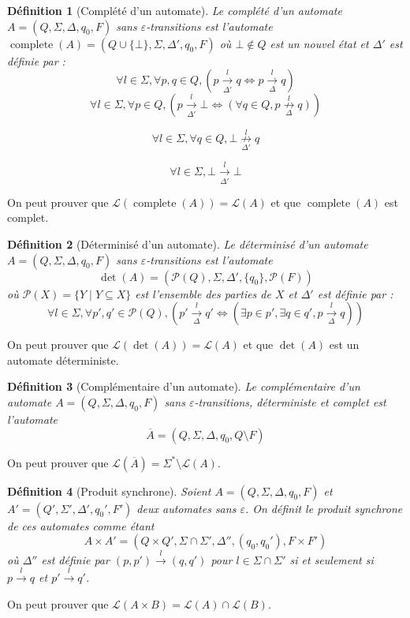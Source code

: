 \documentclass[10pt,a4paper]{article}
\newtheorem{mydef}{D\'efinition}
\begin{document}
\begin{mydef}[Compl\'et\'e d'un automate]
Le compl\'et\'e d'un automate $A = (Q, \Sigma, \Delta, q_0, F)$ sans $\varepsilon$-transitions est l'automate $\operatorname{complete}(A) = (Q\cup\{\bot\}, \Sigma, \Delta', q_0, F)$ o\`u $\bot\not\in Q$ est un nouvel \'etat et $\Delta'$ est d\'efinie par :
$$\forall l \in \Sigma,\forall p,q \in Q, \left(p\underset{\Delta'}{\overset{l}{{\to}}}q \iff p\underset{\Delta}{\overset{l}{{\to}}}q\right)$$
$$\forall l \in \Sigma, \forall p \in Q, \left(p\underset{\Delta'}{\overset{l}{{\to}}}\bot \iff \left(\forall q \in Q, p\underset{\Delta}{\overset{l}{{\not\to}}}q\right)\right)$$

$$\forall l \in \Sigma, \forall q \in Q,\bot\underset{\Delta'}{\overset{l}{{\not\to}}}q$$

$$\forall l \in \Sigma, \bot\underset{\Delta'}{\overset{l}{{\to}}}\bot$$
\end{mydef}

On peut prouver que $\mathcal L(\operatorname{complete}(A)) = \mathcal L(A)$ et que $\operatorname{complete}(A)$ est complet.

\begin{mydef}[D\'eterminis\'e d'un automate]
Le d\'eterminis\'e d'un automate $A = (Q, \Sigma, \Delta, q_0, F)$ sans $\varepsilon$-transitions est l'automate $$\det(A) = (\mathcal P(Q), \Sigma, \Delta', \{q_0\}, \mathcal P(F))$$ o\`u $\mathcal P(X)=\{Y\mid Y \subseteq X\}$ est l'ensemble des parties de $X$ et $\Delta'$ est d\'efinie par :
$$\forall l \in \Sigma,\forall p',q' \in \mathcal P(Q), \left(p'\underset{\Delta}{\overset{l}{{\to}}}q' \iff \left( \exists p \in p', \exists q \in q', p\underset{\Delta}{\overset{l}{{\to}}}q\right)\right)$$
\end{mydef}

On peut prouver que $\mathcal L(\det(A))=\mathcal L(A)$ et que $\det(A)$ est un automate d\'eterministe.

\begin{mydef}[Compl\'ementaire d'un automate]
Le compl\'ementaire d'un automate $A = (Q, \Sigma, \Delta, q_0, F)$ sans $\varepsilon$-transitions, d\'eterministe et complet est l'automate $$\overline{A} = (Q, \Sigma, \Delta, q_0, Q\setminus F)$$
\end{mydef}

On peut prouver que $\mathcal L\left(\overline{A}\right) = \Sigma^* \setminus \mathcal L(A)$.

\begin{mydef}[Produit synchrone]
Soient $A = (Q, \Sigma, \Delta, q_0, F)$ et $A' = (Q', \Sigma', \Delta', q_0', F')$ deux automates sans $\varepsilon$. On définit le produit synchrone de ces automates comme \'etant $$A\times A' = (Q \times Q', \Sigma \cap \Sigma', \Delta'', (q_0, q_0'), F\times F')$$ o\`u $\Delta''$ est d\'efinie par $(p,p')\overset{l}{{\to}}(q,q')$ pour $l\in \Sigma\cap \Sigma'$ si et seulement si $p\overset{l}{{\to}}q$ et $p'\overset{l}{{\to}}q'$.
\end{mydef}
On peut prouver que $\mathcal L(A\times B) = \mathcal L(A) \cap \mathcal L(B)$.
\end{document}
